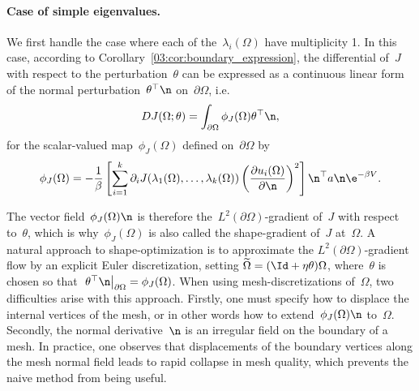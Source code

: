 \paragraph{Case of simple eigenvalues.}
We first handle the case where each of the~$\lambda_i(\Omega)$ have multiplicity 1.
In this case, according to Corollary~\ref{03:cor:boundary_expression}, the differential of~$J$ with respect to the perturbation~$\theta$ can be expressed as a continuous linear form of the normal perturbation~$\theta^\top\n$ on~$\partial\Omega$, i.e.
\begin{equation}
    D J(\Omega;\theta) = \int_{\partial\Omega}\phi_J(\Omega)\theta^\top\n,
\end{equation}
for the scalar-valued map~$\phi_J(\Omega)$ defined on~$\partial\Omega$ by
\begin{equation}
    \label{03:eq:shape_gradient_explicit}
    \phi_J(\Omega) = -\frac1\beta \left[\sum_{i=1}^k\partial_i J(\lambda_1(\Omega),\dots,\lambda_k(\Omega))\left(\frac{\partial u_i(\Omega)}{\partial\n}\right)^2\right]\n^\top a\n \e^{-\beta V}.
\end{equation}

The vector field~$\phi_J(\Omega) \n$ is therefore the~$L^2(\partial\Omega)$-gradient of~$J$ with respect to~$\theta$, which is why~$\phi_J(\Omega)$ is also called the shape-gradient of~$J$ at~$\Omega$.
A natural approach to shape-optimization is to approximate the $L^2(\partial\Omega)$-gradient flow by an explicit Euler discretization, setting $\widetilde\Omega = (\Id+\eta\theta)\Omega$, where~$\theta$ is chosen so that~$\left.\theta^\top\n\right|_{\partial\Omega}=\phi_J(\Omega)$.
When using mesh-discretizations of~$\Omega$, two difficulties arise with this approach. Firstly, one must specify how to displace the internal vertices of the mesh, or in other words how to extend~$\phi_J(\Omega)\n$ to~$\Omega$.
Secondly, the normal derivative~$\n$ is an irregular field on the boundary of a mesh. In practice, one observes that displacements of the boundary vertices along the mesh normal field leads to rapid collapse in mesh quality, which prevents the naive method from being useful.

